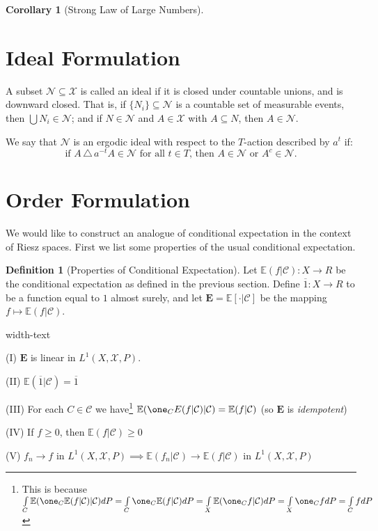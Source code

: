 \documentclass[letterpaper,10pt,oneside,onecolumn,reqno]{amsart}
\newcommand{\C}{\mathcal C}
\newcommand{\E}{\mathbb E}
\newcommand{\N}{\mathcal N}
\newcommand{\X}{\mathcal X}
\theoremstyle{definition}
\newtheorem{cor}[thm]{Corollary}
\newtheorem{defn}[thm]{Definition}
\renewcommand{\bar}[1]{\overline{#1}}
\begin{document}
		\begin{cor}[Strong Law of Large Numbers]
		
		\end{cor}

	\section{Ideal Formulation}

	A subset $\N \subseteq \X$ is called an ideal if it is closed under countable unions, and is downward closed. That is, if $\{ N_i \} \subseteq \N$ is a countable set of measurable events, then $\bigcup N_i \in \N$; and if $N \in \N$ and $A \in \X$ with $A \subseteq N$, then $A \in \N$.

	We say that $\N$ is an ergodic ideal with respect to the $T$-action described by $a^t$ if:
		$$\mbox{if $A \,\triangle\, a^{-t} A \in \N$ for all $t \in T$, then $A \in \N$ or $A^c \in \N$.}$$

\section{Order Formulation}
\label{sec:order-formulation}
We would like to construct an analogue of conditional expectation in the context of Riesz spaces. First we list some properties of the usual conditional expectation.

\begin{defn}[Properties of Conditional Expectation]
\label{def:1}
Let $\E(f|\C) : X \to R$ be the conditional expectation as defined in the previous section. Define $\bar{1} : X \to R$ to be a function equal to $1$ almost surely, and let $\mathbf{E}=\E[\cdot|\C]$ be the mapping $f \mapsto \E(f|\C)$.
\begin{deflist}{width-text}
\item[(I)] $\mathbf{E}$ is linear in $L^1(X,\X,P)$. 
\item[(II)] $\E(\bar{1}|\C) = \bar{1}$
\item[(III)] For each $C \in \C$ we have\footnote{This is because $\int\limits_C\E(\one_C \E(f|\C)|\C)dP=\int\limits_C \one_C \E(f|\C)dP=\int\limits_X \E(\one_C f | \C)dP=\int\limits_X \one_C fdP=\int\limits_C fdP$ \label{fn:3}} $\E(\one_C E(f|\C)|\C) = \E(f|\C)$ (so $\mathbf{E}$ is \emph{idempotent}) 
\item[(IV)] If $f \geq 0$, then $\E(f|\C) \geq 0$
\item[(V)] $f_n \rightarrow f$ in $L^1(X,\X,P) \implies \E(f_n|\C) \rightarrow \E(f|\C)$ in $L^1(X,\X,P)$
\end{deflist}
\end{defn}
\end{document}
